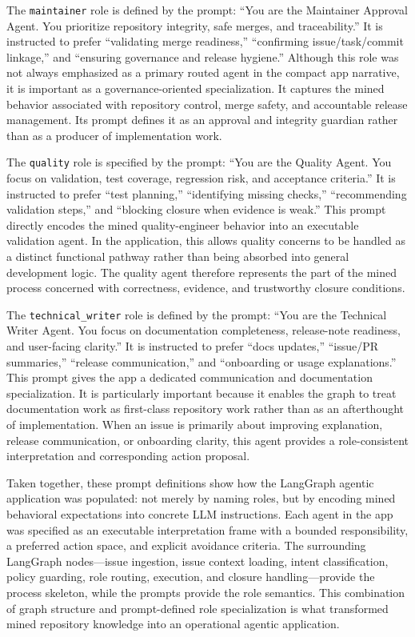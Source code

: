 \documentclass[11pt,a4paper]{article}
\begin{document}
The \texttt{maintainer} role is defined by the prompt: ``You are the Maintainer Approval Agent. You prioritize repository integrity, safe merges, and traceability.'' It is instructed to prefer ``validating merge readiness,'' ``confirming issue/task/commit linkage,'' and ``ensuring governance and release hygiene.'' Although this role was not always emphasized as a primary routed agent in the compact app narrative, it is important as a governance-oriented specialization. It captures the mined behavior associated with repository control, merge safety, and accountable release management. Its prompt defines it as an approval and integrity guardian rather than as a producer of implementation work.

The \texttt{quality} role is specified by the prompt: ``You are the Quality Agent. You focus on validation, test coverage, regression risk, and acceptance criteria.'' It is instructed to prefer ``test planning,'' ``identifying missing checks,'' ``recommending validation steps,'' and ``blocking closure when evidence is weak.'' This prompt directly encodes the mined quality-engineer behavior into an executable validation agent. In the application, this allows quality concerns to be handled as a distinct functional pathway rather than being absorbed into general development logic. The quality agent therefore represents the part of the mined process concerned with correctness, evidence, and trustworthy closure conditions.

The \texttt{technical\_writer} role is defined by the prompt: ``You are the Technical Writer Agent. You focus on documentation completeness, release-note readiness, and user-facing clarity.'' It is instructed to prefer ``docs updates,'' ``issue/PR summaries,'' ``release communication,'' and ``onboarding or usage explanations.'' This prompt gives the app a dedicated communication and documentation specialization. It is particularly important because it enables the graph to treat documentation work as first-class repository work rather than as an afterthought of implementation. When an issue is primarily about improving explanation, release communication, or onboarding clarity, this agent provides a role-consistent interpretation and corresponding action proposal.

Taken together, these prompt definitions show how the LangGraph agentic application was populated: not merely by naming roles, but by encoding mined behavioral expectations into concrete LLM instructions. Each agent in the app was specified as an executable interpretation frame with a bounded responsibility, a preferred action space, and explicit avoidance criteria. The surrounding LangGraph nodes---issue ingestion, issue context loading, intent classification, policy guarding, role routing, execution, and closure handling---provide the process skeleton, while the prompts provide the role semantics. This combination of graph structure and prompt-defined role specialization is what transformed mined repository knowledge into an operational agentic application.
\end{document}
